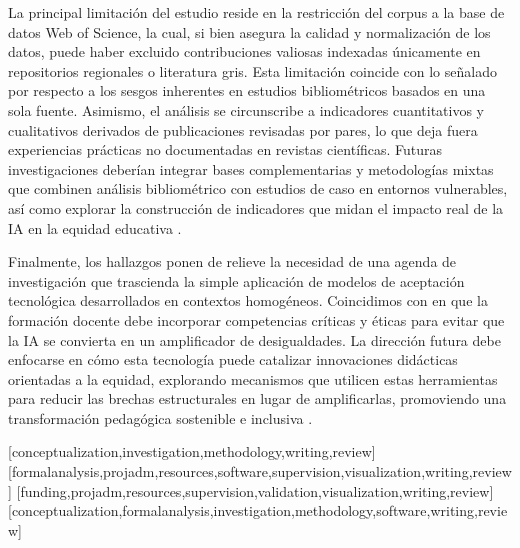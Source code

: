 \documentclass[spanish]{textolivre}
\begin{document}
La principal limitación del estudio reside en la restricción del corpus a la base de datos Web of Science, la cual, si bien asegura la calidad y normalización de los datos, puede haber excluido contribuciones valiosas indexadas únicamente en repositorios regionales o literatura gris. Esta limitación coincide con lo señalado por \textcite{donthu2021} respecto a los sesgos inherentes en estudios bibliométricos basados en una sola fuente. Asimismo, el análisis se circunscribe a indicadores cuantitativos y cualitativos derivados de publicaciones revisadas por pares, lo que deja fuera experiencias prácticas no documentadas en revistas científicas. Futuras investigaciones deberían integrar bases complementarias y metodologías mixtas que combinen análisis bibliométrico con estudios de caso en entornos vulnerables, así como explorar la construcción de indicadores que midan el impacto real de la IA en la equidad educativa \cite{grajeda2024}.

Finalmente, los hallazgos ponen de relieve la necesidad de una agenda de investigación que trascienda la simple aplicación de modelos de aceptación tecnológica desarrollados en contextos homogéneos. Coincidimos con \textcite{ayusodelpuerto2022} en que la formación docente debe incorporar competencias críticas y éticas para evitar que la IA se convierta en un amplificador de desigualdades. La dirección futura debe enfocarse en cómo esta tecnología puede catalizar innovaciones didácticas orientadas a la equidad, explorando mecanismos que utilicen estas herramientas para reducir las brechas estructurales en lugar de amplificarlas, promoviendo una transformación pedagógica sostenible e inclusiva \cite{floresvivar2023}.




\printbibliography\label{sec-bib}


\begin{contributors}
[conceptualization,investigation,methodology,writing,review]
[formalanalysis,projadm,resources,software,supervision,visualization,writing,review]
[funding,projadm,resources,supervision,validation,visualization,writing,review]
[conceptualization,formalanalysis,investigation,methodology,software,writing,review]
\end{contributors}
\end{document}
